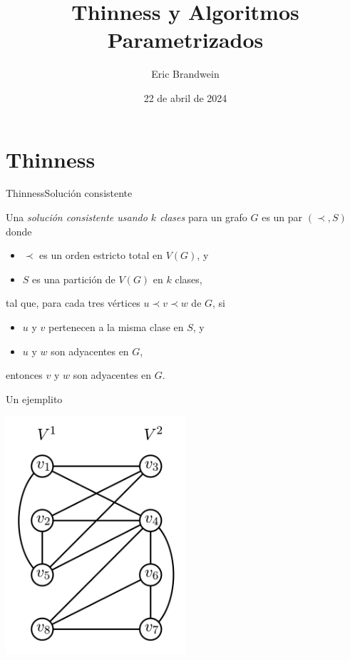 \documentclass[spanish]{beamer}
\title{Thinness y Algoritmos Parametrizados}
\author{Eric Brandwein}
\date{22 de abril de 2024}
\begin{document}
\begin{frame}
  \titlepage
\end{frame}

\section{Thinness}
\begin{frame}{Thinness}{Solución consistente}
    \begin{definition}
        Una \emph{solución consistente usando $k$ clases} para un grafo $G$ es un par $(\prec, S)$ donde 
        \begin{itemize}
            \item $\prec$ es un orden estricto total en $V(G)$, y 
            \item $S$ es una partición de $V(G)$ en $k$ clases,
        \end{itemize}
        tal que, para cada tres vértices $u\prec v \prec w$ de $G$, si
        \begin{itemize}
            \item $u$ y $v$ pertenecen a la misma clase en $S$, y
            \item $u$ y $w$ son adyacentes en $G$,
        \end{itemize}
        entonces $v$ y $w$ son adyacentes en $G$.
    \end{definition}
\end{frame}

\begin{frame}{Un ejemplito}
    \begin{center}
        \includegraphics[width=0.5\textwidth]{img/ejemplo_thinness.png}
    \end{center}
\end{frame}
\end{document}
